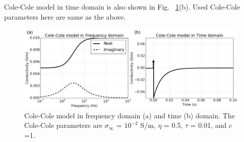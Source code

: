 \documentclass[letterpaper,11pt]{article}
\newcommand{\siginf}{\sigma_\infty}
\begin{document}
Cole-Cole model in time domain is also shown in Fig. ~\ref{Fig:FDandTDCole}(b). Used Cole-Cole parameters here are same as the above.
\begin{figure}
  \includegraphics[width=1.0\textwidth]{figures/FDandTDCole.png}
  \caption{Cole-Cole model in frequency domain (a) and time (b) domain. The Cole-Cole parameters are $\siginf$ = $10^{-2}$ S/m, $\eta $ = 0.5, $\tau$ = 0.01, and $c$=1.}
  \label{Fig:FDandTDCole}
\end{figure}

\end{document}
